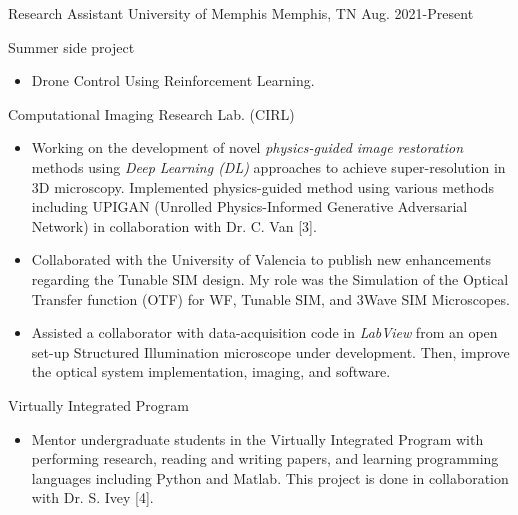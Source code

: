 

\begin{cventries}

  \cventry
    {Research Assistant} %
    {University of Memphis} %
    {Memphis, TN} %
    {Aug. 2021-Present} %
    {
      \begin{cvitems} %
      \item{Summer side project}
      \begin{itemize}[label= - ]
                \item Drone Control Using Reinforcement Learning.
        \end{itemize}   
      \item{Computational Imaging Research Lab. (CIRL)}
      \begin{itemize}[label= - ]
                \item{Working on the development of novel \textit{physics-guided image restoration} methods using \textit{Deep Learning (DL)} approaches to achieve super-resolution in 3D microscopy. Implemented physics-guided method using various methods including UPIGAN (Unrolled Physics-Informed Generative Adversarial Network) in collaboration with Dr. C. Van [3].}
              \item{Collaborated with the University of Valencia to publish new enhancements regarding the Tunable SIM design. My role was the Simulation of the Optical Transfer function (OTF) for WF, Tunable SIM, and 3Wave SIM Microscopes.}
              \item{Assisted a collaborator with data-acquisition code in \textit{LabView} from an open set-up Structured Illumination microscope under development. Then, improve the optical system implementation, imaging, and software.}
        \end{itemize}    
        \item{Virtually Integrated Program}
        \begin{itemize}
              \item {Mentor undergraduate students in the Virtually Integrated Program with performing research, reading and writing papers, and learning programming languages including Python and Matlab. This project is done in collaboration with Dr. S. Ivey [4].}

\end{itemize}
\end{cvitems}}
\end{cventries}
